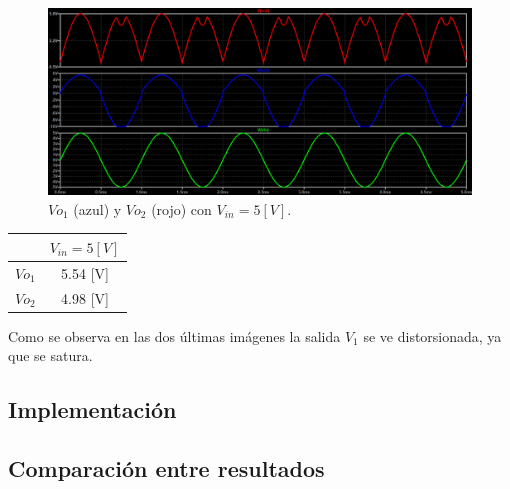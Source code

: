 \begin{figure}[H]
	\centering
	\includegraphics[width=1\textwidth]{figuras/Vo1_Vo2_Vin=5.png}
	\caption{$Vo_1$ (azul) y $Vo_2$ (rojo) con $V_{in}=5[V]$.}
\end{figure}
\begin{center}
	\begin{tabular}{| c | c |}
		\hline
		& $V_{in}= 5[V]$ \\ \hline
		$Vo_1$ 	&  	5.54 [V] 	 \\
		$Vo_2$ 	& 	4.98 [V]	 \\ \hline
	\end{tabular}
\end{center}
Como se observa en las dos últimas imágenes la salida $V_1$ se ve distorsionada, ya que se satura.
\subsection{Implementación}

\subsection{Comparación entre resultados}